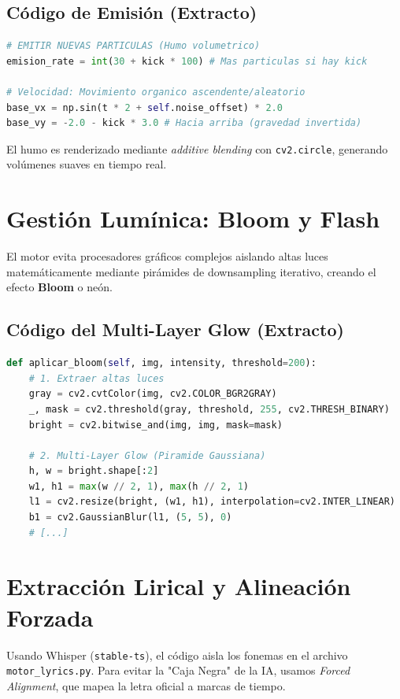 \documentclass[12pt, openany]{book}
\begin{document}
\section{Código de Emisión (Extracto)}
\begin{lstlisting}[language=Python]
# EMITIR NUEVAS PARTICULAS (Humo volumetrico)
emision_rate = int(30 + kick * 100) # Mas particulas si hay kick

# Velocidad: Movimiento organico ascendente/aleatorio
base_vx = np.sin(t * 2 + self.noise_offset) * 2.0
base_vy = -2.0 - kick * 3.0 # Hacia arriba (gravedad invertida)
\end{lstlisting}
El humo es renderizado mediante \textit{additive blending} con \texttt{cv2.circle}, generando volúmenes suaves en tiempo real.

\chapter{Gestión Lumínica: Bloom y Flash}
El motor evita procesadores gráficos complejos aislando altas luces matemáticamente mediante pirámides de downsampling iterativo, creando el efecto \textbf{Bloom} o neón.

\section{Código del Multi-Layer Glow (Extracto)}
\begin{lstlisting}[language=Python]
def aplicar_bloom(self, img, intensity, threshold=200):
    # 1. Extraer altas luces
    gray = cv2.cvtColor(img, cv2.COLOR_BGR2GRAY)
    _, mask = cv2.threshold(gray, threshold, 255, cv2.THRESH_BINARY)
    bright = cv2.bitwise_and(img, img, mask=mask)
    
    # 2. Multi-Layer Glow (Piramide Gaussiana)
    h, w = bright.shape[:2]
    w1, h1 = max(w // 2, 1), max(h // 2, 1)
    l1 = cv2.resize(bright, (w1, h1), interpolation=cv2.INTER_LINEAR)
    b1 = cv2.GaussianBlur(l1, (5, 5), 0)
    # [...]
\end{lstlisting}

\chapter{Extracción Lirical y Alineación Forzada}
Usando Whisper (\texttt{stable-ts}), el código aisla los fonemas en el archivo \texttt{motor\_lyrics.py}. Para evitar la "Caja Negra" de la IA, usamos \textit{Forced Alignment}, que mapea la letra oficial a marcas de tiempo.
\end{document}

